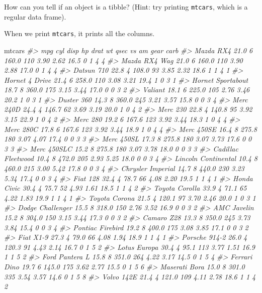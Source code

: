 \documentclass[]{book}
\newenvironment{Shaded}{\begin{snugshade}}{\end{snugshade}}
\newcommand{\CommentTok}[1]{\textcolor[rgb]{0.56,0.35,0.01}{\textit{#1}}}
\newcommand{\NormalTok}[1]{#1}
\theoremstyle{plain}
\theoremstyle{remark}
\begin{document}
How can you tell if an object is a tibble? (Hint: try printing \texttt{mtcars}, which is a regular data frame).

When we print \texttt{mtcars}, it prints all the columns.

\begin{Shaded}
\begin{Highlighting}[]
\NormalTok{mtcars}
\CommentTok{#>                      mpg cyl  disp  hp drat   wt qsec vs am gear carb}
\CommentTok{#> Mazda RX4           21.0   6 160.0 110 3.90 2.62 16.5  0  1    4    4}
\CommentTok{#> Mazda RX4 Wag       21.0   6 160.0 110 3.90 2.88 17.0  0  1    4    4}
\CommentTok{#> Datsun 710          22.8   4 108.0  93 3.85 2.32 18.6  1  1    4    1}
\CommentTok{#> Hornet 4 Drive      21.4   6 258.0 110 3.08 3.21 19.4  1  0    3    1}
\CommentTok{#> Hornet Sportabout   18.7   8 360.0 175 3.15 3.44 17.0  0  0    3    2}
\CommentTok{#> Valiant             18.1   6 225.0 105 2.76 3.46 20.2  1  0    3    1}
\CommentTok{#> Duster 360          14.3   8 360.0 245 3.21 3.57 15.8  0  0    3    4}
\CommentTok{#> Merc 240D           24.4   4 146.7  62 3.69 3.19 20.0  1  0    4    2}
\CommentTok{#> Merc 230            22.8   4 140.8  95 3.92 3.15 22.9  1  0    4    2}
\CommentTok{#> Merc 280            19.2   6 167.6 123 3.92 3.44 18.3  1  0    4    4}
\CommentTok{#> Merc 280C           17.8   6 167.6 123 3.92 3.44 18.9  1  0    4    4}
\CommentTok{#> Merc 450SE          16.4   8 275.8 180 3.07 4.07 17.4  0  0    3    3}
\CommentTok{#> Merc 450SL          17.3   8 275.8 180 3.07 3.73 17.6  0  0    3    3}
\CommentTok{#> Merc 450SLC         15.2   8 275.8 180 3.07 3.78 18.0  0  0    3    3}
\CommentTok{#> Cadillac Fleetwood  10.4   8 472.0 205 2.93 5.25 18.0  0  0    3    4}
\CommentTok{#> Lincoln Continental 10.4   8 460.0 215 3.00 5.42 17.8  0  0    3    4}
\CommentTok{#> Chrysler Imperial   14.7   8 440.0 230 3.23 5.34 17.4  0  0    3    4}
\CommentTok{#> Fiat 128            32.4   4  78.7  66 4.08 2.20 19.5  1  1    4    1}
\CommentTok{#> Honda Civic         30.4   4  75.7  52 4.93 1.61 18.5  1  1    4    2}
\CommentTok{#> Toyota Corolla      33.9   4  71.1  65 4.22 1.83 19.9  1  1    4    1}
\CommentTok{#> Toyota Corona       21.5   4 120.1  97 3.70 2.46 20.0  1  0    3    1}
\CommentTok{#> Dodge Challenger    15.5   8 318.0 150 2.76 3.52 16.9  0  0    3    2}
\CommentTok{#> AMC Javelin         15.2   8 304.0 150 3.15 3.44 17.3  0  0    3    2}
\CommentTok{#> Camaro Z28          13.3   8 350.0 245 3.73 3.84 15.4  0  0    3    4}
\CommentTok{#> Pontiac Firebird    19.2   8 400.0 175 3.08 3.85 17.1  0  0    3    2}
\CommentTok{#> Fiat X1-9           27.3   4  79.0  66 4.08 1.94 18.9  1  1    4    1}
\CommentTok{#> Porsche 914-2       26.0   4 120.3  91 4.43 2.14 16.7  0  1    5    2}
\CommentTok{#> Lotus Europa        30.4   4  95.1 113 3.77 1.51 16.9  1  1    5    2}
\CommentTok{#> Ford Pantera L      15.8   8 351.0 264 4.22 3.17 14.5  0  1    5    4}
\CommentTok{#> Ferrari Dino        19.7   6 145.0 175 3.62 2.77 15.5  0  1    5    6}
\CommentTok{#> Maserati Bora       15.0   8 301.0 335 3.54 3.57 14.6  0  1    5    8}
\CommentTok{#> Volvo 142E          21.4   4 121.0 109 4.11 2.78 18.6  1  1    4    2}
\end{Highlighting}
\end{Shaded}
\end{document}
